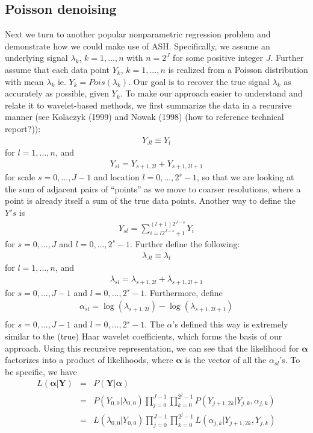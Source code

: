 \documentclass[12pt]{article}
\newcommand{\Ga}{\alpha}
\newcommand{\Gl}{\lambda}    \newcommand{\GL}{\Lambda}
\begin{document}
\subsection{Poisson denoising}
Next we turn to another popular nonparametric regression problem and demonstrate how we could make use of ASH. Specifically, we assume an underlying signal $\Gl_k$, $k=1,...,n$ with $n=2^J$ for some positive integer $J$. Further assume that each data point $Y_k$, $k=1,...,n$ is realized from a Poisson distribution with mean $\Gl_k$ ie. $Y_k=Pois(\Gl_k)$. Our goal is to recover the true signal $\Gl_k$ as accurately as possible, given $Y_k$. To make our approach easier to understand and relate it to wavelet-based methods, we first summarize the data in a recursive manner (see Kolaczyk (1999) and Nowak (1998) (how to reference technical report?)):
\begin{eqnarray}Y_{Jl}\equiv Y_l\end{eqnarray}
for $l=1,...,n$, and
\begin{eqnarray}Y_{sl}=Y_{s+1,2l}+Y_{s+1,2l+1}\end{eqnarray}
for scale $s=0,...,J-1$ and location $l=0,...,2^s-1$, so that we are looking at the sum of adjacent pairs of ``points'' as we move to coarser resolutions, where a point is already itself a sum of the true data points. Another way to define the $Y's$ is
\begin{eqnarray}Y_{sl}=\sum_{i=l2^{J-s}+1}^{(l+1)2^{J-s}}Y_i\end{eqnarray}
for $s=0,...,J$ and $l=0,...,2^s-1$.
Further define the following:
\begin{eqnarray}\Gl_{Jl}\equiv \Gl_l\end{eqnarray}
for $l=1,...,n$, and
\begin{eqnarray}\Gl_{sl}=\Gl_{s+1,2l}+\Gl_{s+1,2l+1}\end{eqnarray}
for $s=0,...,J-1$ and $l=0,...,2^s-1$. Furthermore, define
\begin{eqnarray}\label{eq:poisson wc}\Ga_{sl}=\log(\Gl_{s+1,2l})-\log(\Gl_{s+1,2l+1})\\\end{eqnarray}
for $s=0,...,J-1$ and $l=0,...,2^s-1$. The ${\Ga}$'s defined this way is extremely similar to the (true) Haar wavelet coefficients, which forms the basis of our approach. Using this recursive representation, we can see that the likelihood for $\bm{\Ga}$ factorizes into a product of likelihoods, where $\bm{\Ga}$ is the vector of all the $\Ga_{sl}$'s. To be specific, we have
\begin{eqnarray}
L(\bm{\Ga}|\mathbf{Y})&=&P(\mathbf{Y}|\bm{\Ga})\\
&=&P(Y_{0,0}|\Gl_{0,0})\prod_{j=0}^{J-1}\prod_{k=0}^{2^j-1}P(Y_{j+1,2k}|Y_{j,k},\Ga_{j,k})\\
&=&L(\Gl_{0,0}|Y_{0,0})\prod_{j=0}^{J-1}\prod_{k=0}^{2^j-1}L(\Ga_{j,k}|Y_{j+1,2k},Y_{j,k})
\end{eqnarray}
\end{document}
